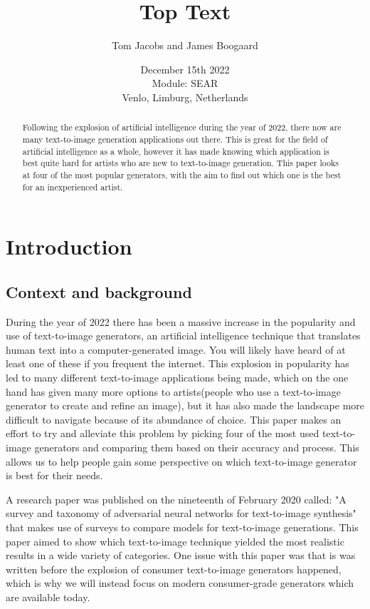 \documentclass[]{report}
\title{Top Text}
\author{Tom Jacobs and James Boogaard}
\date{December 15th 2022 \\Module: SEAR \\Venlo, Limburg, Netherlands}
\begin{document}
	
	\maketitle
	
	\begin{abstract}
		Following the explosion of artificial intelligence during the year of 2022, there now are many text-to-image generation applications out there. This is great for the field of artificial intelligence as a whole, however it has made knowing which application is best quite hard for artists who are new to text-to-image generation. This paper looks at four of the most popular generators, with the aim to find out which one is the best for an inexperienced artist.
		
		
	\end{abstract}
	
	\tableofcontents
	\setcounter{page}{3}
	\listoffigures %
	\pagebreak
	
	
	\section{Introduction}
	
	\subsection{Context and background}
During the year of 2022 there has been a massive increase in the popularity and use of text-to-image generators, an artificial intelligence technique that translates human text into a computer-generated image. You will likely have heard of at least one of these if you frequent the internet. This explosion in popularity has led to many different text-to-image applications being made, which on the one hand has given many more options to artists(people who use a text-to-image generator to create and refine an image), but it has also made the landscape more difficult to navigate because of its abundance of choice. This paper makes an effort to try and alleviate this problem by picking four of the most used text-to-image generators and comparing them based on their accuracy and process. This allows us to help people gain some perspective on which text-to-image generator is best for their needs.

A research paper was published on the nineteenth of February 2020 called: "A survey and taxonomy of adversarial neural networks for text-to-image synthesis" that makes use of surveys to compare models for text-to-image generations. This paper aimed to show which text-to-image technique yielded the most realistic results in a wide variety of categories. One issue with this paper was that is was written before the explosion of consumer text-to-image generators happened, which is why we will instead focus on modern consumer-grade generators which are available today.
\end{document}
